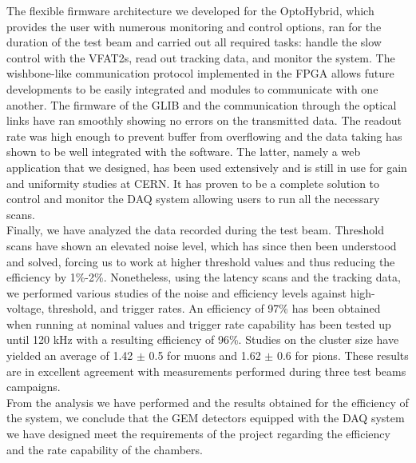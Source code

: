     The flexible firmware architecture we developed for the OptoHybrid, which provides the user with numerous monitoring and control options, ran for the duration of the test beam and carried out all required tasks: handle the slow control with the VFAT2s, read out tracking data, and monitor the system. The wishbone-like communication protocol implemented in the FPGA allows future developments to be easily integrated and modules to communicate with one another. The firmware of the GLIB and the communication through the optical links have ran smoothly showing no errors on the transmitted data. The readout rate was high enough to prevent buffer from overflowing and the data taking has shown to be well integrated with the software. The latter, namely a web application that we designed, has been used extensively and is still in use for gain and uniformity studies at CERN. It has proven to be a complete solution to control and monitor the DAQ system allowing users to run all the necessary scans. \\

    Finally, we have analyzed the data recorded during the test beam. Threshold scans have shown an elevated noise level, which has since then been understood and solved, forcing us to work at higher threshold values and thus reducing the efficiency by 1\%-2\%. Nonetheless, using the latency scans and the tracking data, we performed various studies of the noise and efficiency levels against high-voltage, threshold, and trigger rates. An efficiency of 97\% has been obtained when running at nominal values and trigger rate capability has been tested up until 120 kHz with a resulting efficiency of 96\%. Studies on the cluster size have yielded an average of 1.42 $\pm$ 0.5 for muons and 1.62 $\pm$ 0.6 for pions. These results are in excellent agreement with measurements performed during three test beams campaigns. \\

    From the analysis we have performed and the results obtained for the efficiency of the system, we conclude that the GEM detectors equipped with the DAQ system we have designed meet the requirements of the project regarding the efficiency and the rate capability of the chambers.
